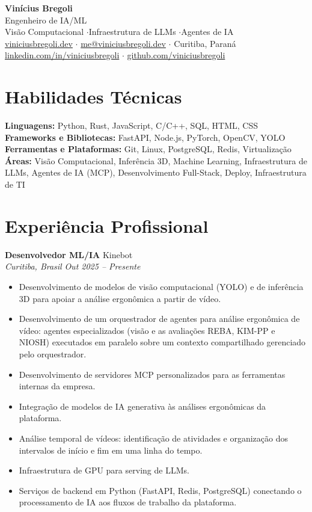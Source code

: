 \documentclass[11pt,a4paper]{article}
\newcommand{\entry}[4]{
    \textbf{#1} \hfill #2 \\
    \textit{#3} \hfill \textit{#4}
}
\begin{document}
\begin{center}
    {\LARGE\bfseries Vinícius Bregoli} \\[4pt]
    Engenheiro de IA/ML \\[1pt]
    Visão Computacional \enspace$\cdot$\enspace Infraestrutura de LLMs \enspace$\cdot$\enspace Agentes de IA \\[6pt]
    \href{https://www.viniciusbregoli.dev}{viniciusbregoli.dev} \enspace$\cdot$\enspace
    \href{mailto:me@viniciusbregoli.dev}{me@viniciusbregoli.dev} \enspace$\cdot$\enspace
    Curitiba, Paraná \\[2pt]
    \href{https://linkedin.com/in/viniciusbregoli/}{linkedin.com/in/viniciusbregoli} \enspace$\cdot$\enspace
    \href{https://github.com/viniciusbregoli}{github.com/viniciusbregoli}
\end{center}

\section{Habilidades Técnicas}
\noindent\textbf{Linguagens:} Python, Rust, JavaScript, C/C++, SQL, HTML, CSS \\
\textbf{Frameworks e Bibliotecas:} FastAPI, Node.js, PyTorch, OpenCV, YOLO \\
\textbf{Ferramentas e Plataformas:} Git, Linux, PostgreSQL, Redis, Virtualização \\
\textbf{Áreas:} Visão Computacional, Inferência 3D, Machine Learning, Infraestrutura de LLMs, Agentes de IA (MCP), Desenvolvimento Full-Stack, Deploy, Infraestrutura de TI

\section{Experiência Profissional}

\entry{Desenvolvedor ML/IA}{Kinebot}{Curitiba, Brasil}{Out 2025 -- Presente}
\begin{itemize}[nosep, leftmargin=*]
    \item Desenvolvimento de modelos de visão computacional (YOLO) e de inferência 3D para apoiar a análise ergonômica a partir de vídeo.
    \item Desenvolvimento de um orquestrador de agentes para análise ergonômica de vídeo: agentes especializados (visão e as avaliações REBA, KIM-PP e NIOSH) executados em paralelo sobre um contexto compartilhado gerenciado pelo orquestrador.
    \item Desenvolvimento de servidores MCP personalizados para as ferramentas internas da empresa.
    \item Integração de modelos de IA generativa às análises ergonômicas da plataforma.
    \item Análise temporal de vídeos: identificação de atividades e organização dos intervalos de início e fim em uma linha do tempo.
    \item Infraestrutura de GPU para serving de LLMs.
    \item Serviços de backend em Python (FastAPI, Redis, PostgreSQL) conectando o processamento de IA aos fluxos de trabalho da plataforma.
\end{itemize}
\end{document}
